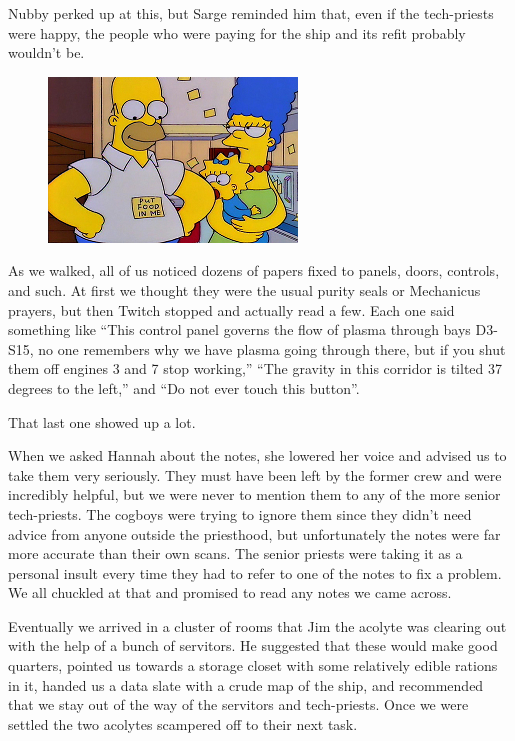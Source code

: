 Nubby perked up at this, but Sarge reminded him that, even if the tech-priests were happy, the people who were paying for the ship and its refit probably wouldn’t be.

\begin{figure}
	\begin{center}
		\includegraphics[width=\figwidth]{pics/7/11.png}
	\end{center}
\end{figure}
As we walked, all of us noticed dozens of papers fixed to panels, doors, controls, and such. 
At first we thought they were the usual purity seals or Mechanicus prayers, but then Twitch stopped and actually read a few. 
Each one said something like “This control panel governs the flow of plasma through bays D3-S15, no one remembers why we have plasma going through there, but if you shut them off engines 3 and 7 stop working,”  “The gravity in this corridor is tilted 37 degrees to the left,” and “Do not ever touch this button”. 

That last one showed up a lot.

When we asked Hannah about the notes, she lowered her voice and advised us to take them very seriously. 
They must have been left by the former crew and were incredibly helpful, but we were never to mention them to any of the more senior tech-priests. 
The cogboys were trying to ignore them since they didn’t need advice from anyone outside the priesthood, but unfortunately the notes were far more accurate than their own scans. 
The senior priests were taking it as a personal insult every time they had to refer to one of the notes to fix a problem. 
We all chuckled at that and promised to read any notes we came across.

Eventually we arrived in a cluster of rooms that Jim the acolyte was clearing out with the help of a bunch of servitors. 
He suggested that these would make good quarters, pointed us towards a storage closet with some relatively edible rations in it, handed us a data slate with a crude map of the ship, and recommended that we stay out of the way of the servitors and tech-priests. 
Once we were settled the two acolytes scampered off to their next task.

